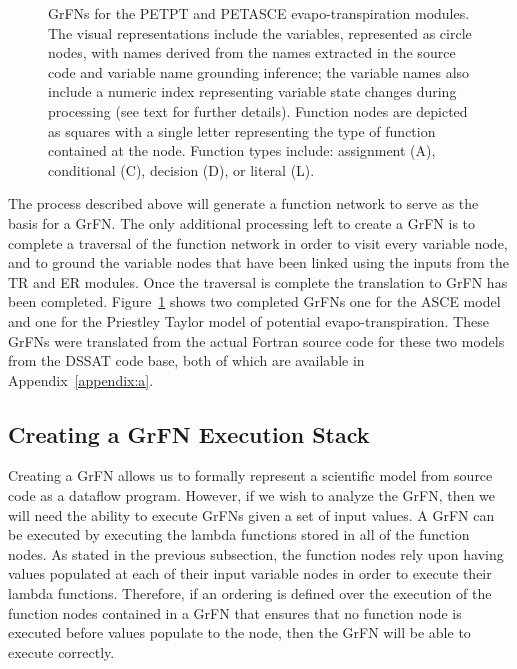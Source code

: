 \begin{figure}[!htbp]
  \label{fig:grfn_cgs}
  \centering
  \hfill
  \caption[Evapo-transpiration GrFN Examples]{GrFNs for the PETPT and PETASCE evapo-transpiration modules. The visual representations include the variables, represented as circle nodes, with names derived from the names extracted in the source code and variable name grounding inference; the variable names also include a numeric index representing variable state changes during processing (see text for further details). Function nodes are depicted as squares with a single letter representing the type of function contained at the node. Function types include: assignment (A), conditional (C), decision (D), or literal (L).}
\end{figure}

The process described above will generate a function network to serve as the basis for a GrFN.
The only additional processing left to create a GrFN is to complete a traversal of the function network in order to visit every variable node, and to ground the variable nodes that have been linked using the inputs from the TR and ER modules.
Once the traversal is complete the translation to GrFN has been completed.
Figure~\ref{fig:grfn_cgs} shows two completed GrFNs one for the ASCE model and one for the Priestley Taylor model of potential evapo-transpiration.
These GrFNs were translated from the actual Fortran source code for these two models from the DSSAT code base, both of which are available in Appendix~\ref{appendix:a}.

\subsection{Creating a GrFN Execution Stack \label{sec:exec_stack_creation}}
Creating a GrFN allows us to formally represent a scientific model from source code as a dataflow program.
However, if we wish to analyze the GrFN, then we will need the ability to execute GrFNs given a set of input values.
A GrFN can be executed by executing the lambda functions stored in all of the function nodes.
As stated in the previous subsection, the function nodes rely upon having values populated at each of their input variable nodes in order to execute their lambda functions.
Therefore, if an ordering is defined over the execution of the function nodes contained in a GrFN that ensures that no function node is executed before values populate to the node, then the GrFN will be able to execute correctly.


